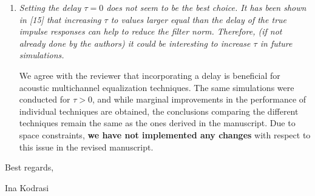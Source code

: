 \documentclass[11pt, a4paper]{article}
\begin{document}
\begin{enumerate}
{\bf We have not implemented any changes} with respect to this issue in the revised manuscript.

\item {\textit{
Setting the delay $\tau=0$ does not seem to be the best choice. It has been shown in [15] that increasing $\tau$ to values larger equal than the delay of the true impulse responses can help to reduce the filter norm. Therefore, (if not already done by the authors) it could be interesting to increase $\tau$ in future simulations.
}}

We agree with the reviewer that incorporating a delay is beneficial for acoustic multichannel equalization techniques.
The same simulations were conducted for $\tau > 0$, and while marginal improvements in the performance of individual techniques are obtained, the conclusions comparing the different techniques remain the same as the ones derived in the manuscript.
Due to space constraints, {\bf we have not implemented any changes} with respect to this issue in the revised manuscript.
\end{enumerate}


Best regards,

Ina Kodrasi
\end{document}
